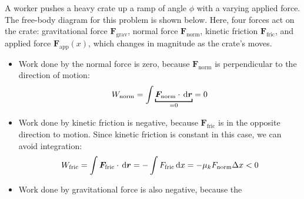 \begin{example}
  A worker pushes a heavy crate up a ramp of angle $\phi$ with a varying
  applied force. The free-body diagram for this problem is shown below. Here,
  four forces act on the crate: gravitational force $\bm F_\text{grav}$, normal
  force $\bm F_\text{norm}$, kinetic friction $\bm F_\text{fric}$, and applied
  force $\bm F_\text{app}(x)$, which changes in magnitude as the crate's moves.
  \begin{center}
  \end{center}
  \begin{itemize}[itemsep=6pt]
  \item Work done by the normal force is zero, because $\bm F_\text{norm}$ is
    perpendicular to the direction of motion:
    \begin{equation*}
      W_\text{norm}=\int\underbracket[1pt]{\bm F_\text{norm}\cdot\dl{\bm r}}_{=0}=0
    \end{equation*}
  \item Work done by kinetic friction is negative, because $\bm F_\text{fric}$
    is in the opposite direction to motion. Since kinetic friction is constant
    in this case, we can avoid integration:
    \begin{equation*}
      W_\text{fric}=\int\bm F_\text{fric}\cdot\dl{\bm r}
      =-\int F_\text{fric}\dl x=-\mu_k F_\text{norm}\Delta x<0
    \end{equation*}
  \item Work done by gravitational force is also negative, because the

\end{itemize}
\end{example}
